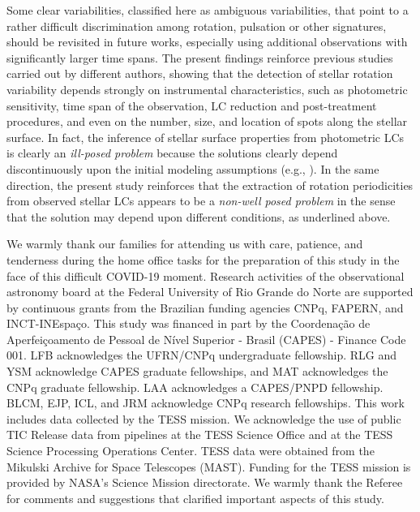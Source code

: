 \documentclass[RNAAS]{aastex63}
\begin{document}
Some clear variabilities, classified here as ambiguous variabilities, that point to a rather difficult discrimination among rotation, pulsation or other signatures, should be revisited in future works, especially using additional observations with significantly larger time spans. The present findings reinforce previous studies carried out by different authors, showing that the detection of stellar rotation variability depends strongly on instrumental characteristics, such as photometric sensitivity, time span of the observation, LC reduction and post-treatment procedures, and even on the number, size, and location of spots along the stellar surface. In fact, the inference of stellar surface properties from photometric LCs is clearly an \textit{ill-posed problem} because the solutions clearly depend discontinuously upon the initial modeling assumptions (e.g., \citealp{Luger2021}). In the same direction, the present study reinforces that the extraction of rotation periodicities from observed stellar LCs appears to be a \textit{non-well posed problem} \citep{Hadamard1902} in the sense that the solution may depend upon different conditions, as underlined above. 

\acknowledgments

We warmly thank our families for attending us with care, patience, and tenderness during the home office tasks for the preparation of this study in the face of this difficult COVID-19 moment. Research activities of the observational astronomy board at the Federal University of Rio Grande do Norte are supported by continuous grants from the Brazilian funding agencies CNPq, FAPERN, and INCT-INEspa\c{c}o. This study was financed in part by the Coordena\c{c}\~ao de Aperfei\c{c}oamento de Pessoal de N\'ivel Superior - Brasil (CAPES) - Finance Code 001. LFB acknowledges the UFRN/CNPq undergraduate fellowship. RLG and YSM acknowledge CAPES graduate fellowships, and MAT acknowledges the CNPq graduate fellowship. LAA acknowledges a CAPES/PNPD fellowship. BLCM, EJP, ICL, and JRM acknowledge CNPq research fellowships. This work includes data collected by the TESS mission. We acknowledge the use of public TIC Release data from pipelines at the TESS Science Office and at the TESS Science Processing Operations Center. TESS data were obtained from the Mikulski Archive for Space Telescopes (MAST). Funding for the TESS mission is provided by NASA's Science Mission directorate. We warmly thank the Referee for comments and suggestions that clarified important aspects of this study.
\end{document}
